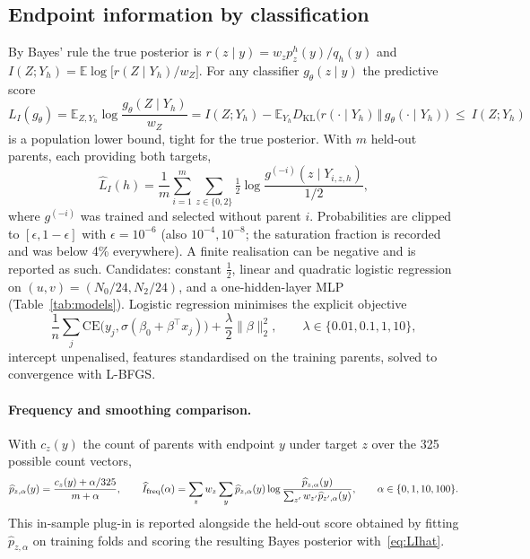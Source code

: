 \documentclass[10pt]{article}
\newcommand{\KL}{D_{\mathrm{KL}}}
\newcommand{\Ex}{\mathbb{E}}
\newcommand{\Lhat}{\widehat L}
\begin{document}
\subsection{Endpoint information by classification}
By Bayes' rule the true posterior is $r(z\mid y)=w_z p_z^h(y)/q_h(y)$ and $I(Z;Y_h)=\Ex\log\big[r(Z\mid Y_h)/w_Z\big]$. For any classifier $g_\theta(z\mid y)$ the predictive score
\begin{equation}
L_I(g_\theta)=\Ex_{Z,Y_h}\log\frac{g_\theta(Z\mid Y_h)}{w_Z}
= I(Z;Y_h)-\Ex_{Y_h}\KL\big(r(\cdot\mid Y_h)\,\Vert\,g_\theta(\cdot\mid Y_h)\big)\ \le\ I(Z;Y_h) \label{eq:LI}
\end{equation}
is a population lower bound, tight for the true posterior. With $m$ held-out parents, each providing both targets,
\begin{equation}
\Lhat_I(h)=\frac1m\sum_{i=1}^m\sum_{z\in\{0,2\}}\tfrac12\log\frac{g^{(-i)}(z\mid Y_{i,z,h})}{1/2}, \label{eq:LIhat}
\end{equation}
where $g^{(-i)}$ was trained and selected without parent $i$. Probabilities are clipped to $[\epsilon,1-\epsilon]$ with $\epsilon=10^{-6}$ (also $10^{-4},10^{-8}$; the saturation fraction is recorded and was below 4\% everywhere). A finite realisation can be negative and is reported as such. Candidates: constant $\tfrac12$, linear and quadratic logistic regression on $(u,v)=(N_0/24,N_2/24)$, and a one-hidden-layer MLP (Table~\ref{tab:models}). Logistic regression minimises the explicit objective
\begin{equation}
\frac1n\sum_j \mathrm{CE}\big(y_j,\sigma(\beta_0+\beta^\top x_j)\big)+\frac{\lambda}{2}\|\beta\|_2^2,\qquad \lambda\in\{0.01,0.1,1,10\},
\end{equation}
intercept unpenalised, features standardised on the training parents, solved to convergence with L-BFGS.

\paragraph{Frequency and smoothing comparison.} With $c_z(y)$ the count of parents with endpoint $y$ under target $z$ over the 325 possible count vectors,
\begin{equation}
\widehat p_{z,\alpha}(y)=\frac{c_z(y)+\alpha/325}{m+\alpha},\qquad
\widehat I_{\rm freq}(\alpha)=\sum_z w_z\sum_y \widehat p_{z,\alpha}(y)\log\frac{\widehat p_{z,\alpha}(y)}{\sum_{z'}w_{z'}\widehat p_{z',\alpha}(y)},\qquad \alpha\in\{0,1,10,100\}.
\end{equation}
This in-sample plug-in is reported alongside the held-out score obtained by fitting $\widehat p_{z,\alpha}$ on training folds and scoring the resulting Bayes posterior with~\eqref{eq:LIhat}.
\end{document}
